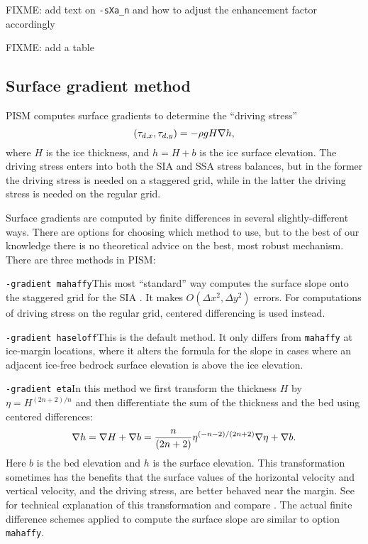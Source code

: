 FIXME: add text on \texttt{-sXa_n} and how to adjust the enhancement factor accordingly

FIXME: add a table

\clearpage

\subsection{Surface gradient method}
\label{subsect:gradient}

PISM computes surface gradients to determine the ``driving stress''
	$$(\tau_{d,x},\tau_{d,y}) = - \rho g H \nabla h,$$
where $H$ is the ice thickness, and $h = H+b$ is the ice surface elevation.  The driving stress enters into both the SIA and SSA stress balances, but in the former the driving stress is needed on a staggered grid, while in the latter the driving stress is needed on the regular grid.

Surface gradients are computed by finite differences in several slightly-different ways.  There are options for choosing which method to use, but to the best of our knowledge there is no theoretical advice on the best, most robust mechanism.  There are three  methods in PISM:

\noindent\texttt{-gradient mahaffy}\quad  This most ``standard'' way computes the surface slope onto the staggered grid for the SIA \cite{Mahaffy}.  It makes $O(\Delta x^2,\Delta y^2)$ errors.  For computations of driving stress on the regular grid, centered differencing is used instead.

\noindent\texttt{-gradient haseloff}\quad  This is the default method.  It only differs from \texttt{mahaffy} at ice-margin locations, where it alters the formula for the slope in cases where an adjacent ice-free bedrock surface elevation is above the ice elevation.

\noindent\texttt{-gradient eta}\quad  In this method we first transform the thickness $H$ by $\eta = H^{(2n+2)/n}$ and then differentiate the sum of the thickness and the bed using centered differences:
	$$\nabla h = \nabla H + \nabla b = \frac{n}{(2n+2)} \eta^{(-n-2)/(2n+2)} \nabla \eta + \nabla b.$$
Here $b$ is the bed elevation and $h$ is the surface elevation.  This transformation sometimes has the benefits that the surface values of the horizontal velocity and vertical velocity, and the driving stress, are better behaved near the margin.  See \cite{BLKCB} for technical explanation of this transformation and compare \cite{SaitoMargin}.  The actual finite difference schemes applied to compute the surface slope are similar to option \texttt{mahaffy}.


